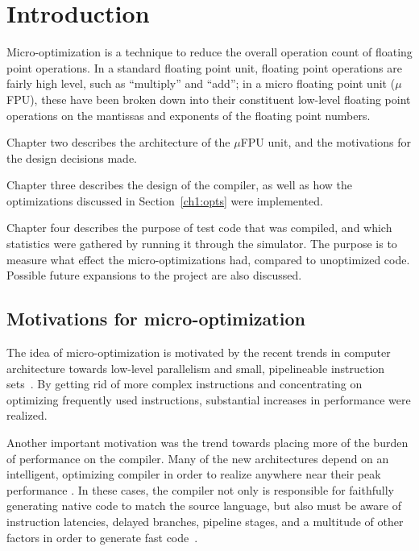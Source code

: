 \chapter{Introduction}

Micro-optimization is a technique to reduce the overall operation count of
floating point operations.  In a standard floating point unit, floating
point operations are fairly high level, such as ``multiply'' and ``add'';
in a micro floating point unit ($\mu$FPU), these have been broken down into
their constituent low-level floating point operations on the mantissas and
exponents of the floating point numbers.

Chapter two describes the architecture of the $\mu$FPU unit, and the
motivations for the design decisions made.

Chapter three describes the design of the compiler, as well as how the
optimizations discussed in Section~\ref{ch1:opts} were implemented.

Chapter four describes the purpose of test code that was compiled, and which
statistics were gathered by running it through the simulator.  The purpose
is to measure what effect the micro-optimizations had, compared to
unoptimized code.  Possible future expansions to the project are also
discussed.

\section{Motivations for micro-optimization}

The idea of micro-optimization is motivated by the recent trends in computer
architecture towards low-level parallelism and small, pipelineable
instruction sets~\cite{patterson:risc,rad83}.  By getting rid of more
complex instructions and concentrating on optimizing frequently used
instructions, substantial increases in performance were realized.

Another important motivation was the trend towards placing more of the
burden of performance on the compiler.  Many of the new architectures depend
on an intelligent, optimizing compiler in order to realize anywhere near
their peak performance
\cite{ellis:bulldog,pet87,coutant:precision-compilers}.  In these cases, the
compiler not only is responsible for faithfully generating native code to
match the source language, but also must be aware of instruction latencies,
delayed branches, pipeline stages, and a multitude of other factors in order
to generate fast code~\cite{gib86}.

